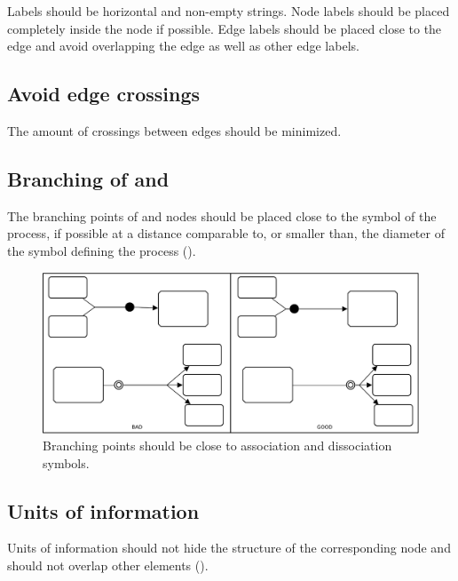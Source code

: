 Labels should be horizontal and non-empty strings. Node labels should be placed completely
inside the node if possible. Edge labels should be placed close to the edge and avoid overlapping the edge as well as other edge
labels.

\subsection{Avoid edge crossings}

The amount of crossings between edges should be minimized.

\subsection{Branching of  and }

The branching points of  and  nodes should be placed close to the symbol of the process, if possible at a distance comparable to, or smaller than, the diameter of the symbol defining the process ().

\begin{figure}[htb]
  \centering
  \includegraphics[scale=0.5]{images/build/layout_branching.pdf}
  \caption{Branching points should be close to association and dissociation symbols.}\label{fig:branching}
\end{figure}

\subsection{Units of information}

Units of information should not hide the structure of the
corresponding node and should not overlap other
elements ().


